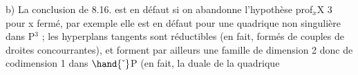 b) La conclusion de 8.16. est en défaut si on abandonne
l'hypothèse prof$_x$X \hand{$\geqslant$} 3 pour x fermé, par exemple elle est en défaut pour
une quadrique non singulière  dans P$^3$ ;   les hyperplans tangents
 sont  réductibles (en fait, formés de couples de droites
concourrantes), et forment par ailleurs une famille de dimension 2
 donc de codimension 1 dans $\hand{\check{\ }}$P (en fait, la duale de la quadrique  
